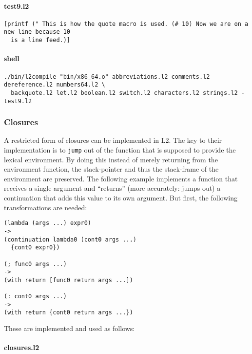 \documentclass[]{article}
\let\oldparagraph\paragraph
\renewcommand{\paragraph}[1]{\oldparagraph{#1}\mbox{}}
\begin{document}
\paragraph{test9.l2}\label{test9.l2}

\begin{verbatim}
[printf (" This is how the quote macro is used. (# 10) Now we are on a new line because 10
  is a line feed.)]
\end{verbatim}

\paragraph{shell}\label{shell-8}

\begin{verbatim}
./bin/l2compile "bin/x86_64.o" abbreviations.l2 comments.l2 dereference.l2 numbers64.l2 \
  backquote.l2 let.l2 boolean.l2 switch.l2 characters.l2 strings.l2 - test9.l2
\end{verbatim}

\hypertarget{closures}{\subsubsection{Closures}\label{closures}}

A restricted form of closures can be implemented in L2. The key to their
implementation is to \texttt{jump} out of the function that is supposed
to provide the lexical environment. By doing this instead of merely
returning from the environment function, the stack-pointer and thus the
stack-frame of the environment are preserved. The following example
implements a function that receives a single argument and ``returns''
(more accurately: jumps out) a continuation that adds this value to its
own argument. But first, the following transformations are needed:

\begin{verbatim}
(lambda (args ...) expr0)
->
(continuation lambda0 (cont0 args ...)
  {cont0 expr0})

(; func0 args ...)
->
(with return [func0 return args ...])

(: cont0 args ...)
->
(with return {cont0 return args ...})
\end{verbatim}

These are implemented and used as follows:

\paragraph{closures.l2}\label{closures.l2}
\end{document}

